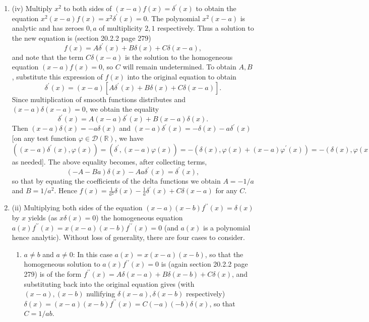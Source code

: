 \documentclass[11pt]{article}
\begin{document}
\begin{enumerate}
    \item[20.1](iv) Multiply $x^2$ to both sides of $(x-a)f(x) =\delta^\prime(x)$ to obtain the equation $x^2(x-a)f(x) = x^2\delta^\prime(x) = 0$. The polynomial $x^2(x-a)$ is analytic and has zeroes $0,a$ of multiplicity $2,1$ respectively. Thus a solution to the new equation is (section 20.2.2 page 279) \[f(x) = A\delta^\prime(x) + B\delta(x) + C\delta(x-a),\] and note that the term $C\delta(x-a)$ is the solution to the homogeneous equation $(x-a)f(x)= 0$, so $C$ will remain undetermined. To obtain $A,B$, substitute this expression of $f(x)$ into the original equation to obtain \[\delta^\prime(x) = (x-a)[A\delta^\prime(x) + B\delta(x) + C\delta(x-a)].\] Since multiplication of smooth functions distributes and $(x-a)\delta(x-a) = 0$, we obtain the equality \[\delta^\prime(x) = A(x-a)\delta^\prime(x) + B(x-a)\delta(x).\] Then $(x-a)\delta(x) = -a\delta(x)$ and $(x-a)\delta^\prime(x) = -\delta(x)-a\delta^\prime(x)$ [on any test function $\varphi\in\mathcal{D}(\mathbb{R})$, we have $((x-a)\delta^\prime(x),\varphi(x)) = (\delta^\prime,(x-a)\varphi(x)) = -(\delta(x),\varphi(x)+(x-a)\varphi^\prime(x)) = -(\delta(x),\varphi(x))-(\delta(x),(x-a)\varphi^\prime(x)) = -(\delta(x),\varphi(x))+a\varphi^\prime(0) = -(\delta(x),\varphi(x))-a(\delta^\prime(x),\varphi(x))$ as needed]. The above equality becomes, after collecting terms, \[(-A-Ba)\delta(x) - Aa\delta^\prime(x) = \delta^\prime(x),\] so that by equating the coefficients of the delta functions we obtain $A = -1/a$ and $B = 1/a^2$. Hence $f(x) = \frac{1}{a^2}\delta(x) - \frac{1}{a}\delta^\prime(x) + C\delta(x-a)$ for any $C$.

    \hrulefill

    \item[21.2](ii) Multiplying both sides of the equation $(x-a)(x-b)f^{\prime\prime}(x) = \delta(x)$ by $x$ yields (as $x\delta(x) = 0$) the homogeneous equation $a(x)f^{\prime\prime}(x) = x(x-a)(x-b)f^{\prime\prime}(x) = 0$ (and $a(x)$ is a polynomial hence analytic). Without loss of generality, there are four cases to consider.\begin{enumerate}
        \item $a\neq b$ and $a\neq 0$:
        In this case $a(x) = x(x-a)(x-b)$, so that the homogeneous solution to $a(x)f^{\prime\prime}(x) = 0$ is (again section 20.2.2 page 279) is of the form $f^{\prime\prime}(x) = A\delta(x-a) + B\delta(x-b) + C\delta(x)$, and substituting back into the original equation gives (with $(x-a),(x-b)$ nullifying $\delta(x-a),\delta(x-b)$ respectively) $\delta(x) = (x-a)(x-b)f^{\prime\prime}(x) = C(-a)(-b)\delta(x)$, so that $C = 1/ab$.


\end{enumerate}
\end{enumerate}
\end{document}

